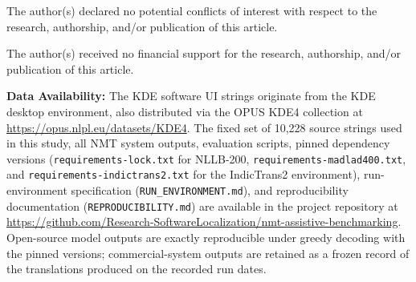 \documentclass[Afour,sagev,times,doublespace]{sagej}
\begin{document}
\begin{dci}
The author(s) declared no potential conflicts of interest with respect to the research, authorship, and/or publication of this article.
\end{dci}

\begin{funding}
The author(s) received no financial support for the research, authorship, and/or publication of this article.
\end{funding}

\noindent\textbf{Data Availability:} The KDE software UI strings originate from the KDE desktop environment, also distributed via the OPUS KDE4 collection at \url{https://opus.nlpl.eu/datasets/KDE4}. The fixed set of 10,228 source strings used in this study, all NMT system outputs, evaluation scripts, pinned dependency versions (\texttt{requirements-lock.txt} for NLLB-200, \texttt{requirements-madlad400.txt}, and \texttt{requirements-indictrans2.txt} for the IndicTrans2 environment), run-environment specification (\texttt{RUN\_ENVIRONMENT.md}), and reproducibility documentation (\texttt{REPRODUCIBILITY.md}) are available in the project repository at \url{https://github.com/Research-SoftwareLocalization/nmt-assistive-benchmarking}. Open-source model outputs are exactly reproducible under greedy decoding with the pinned versions; commercial-system outputs are retained as a frozen record of the translations produced on the recorded run dates.
\end{document}

